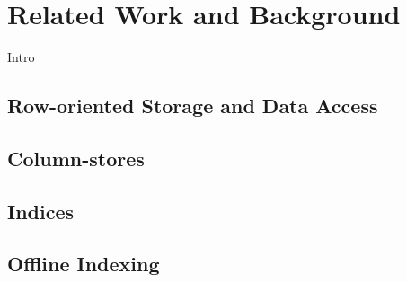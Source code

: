 \chapter{Related Work and Background} %

\label{RelatedWork} %



Intro


\section{Row-oriented Storage and Data Access}
\label{sec:row-oriented}


\section{Column-stores}
\label{sec:column-stores}


\section{Indices}
\label{sec:indices}


\section{Offline Indexing}
\label{sec:holistic}

